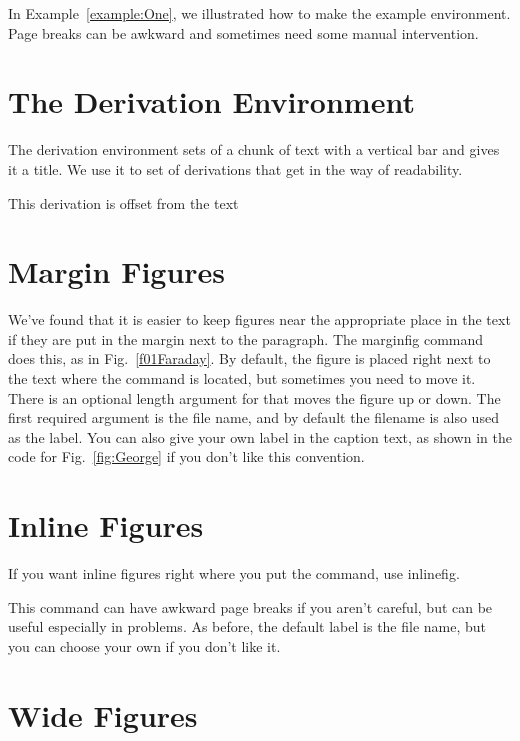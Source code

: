 In Example~\ref{example:One}, we illustrated how to make the
example environment. Page breaks can be awkward and sometimes need
some manual intervention.

\section{The Derivation Environment}

The derivation environment sets of a chunk of text with a vertical
bar and gives it a title.  We use it to set of derivations that get
in the way of readability.
\begin{derivation}{This derivation is offset from the text}
        \lipsum[6-7]
\end{derivation}

\section{Margin Figures}


We've found that it is easier to keep figures near the appropriate
place in the text if they are put in the margin next to the
paragraph.  The marginfig command does this, as in
Fig.~\ref{f01Faraday}.  By default, the figure is placed right next
to the text where the command is located, but sometimes you need to
move it.  There is an optional length argument for that moves the
figure up or down.  The first required argument is the file name,
and by default the filename is also used as the label.  You can
also give your own label in the caption text, as shown in the code
for Fig.~\ref{fig:George} if you don't like this convention.

\section{Inline Figures}
If you want inline figures right where you put the command, use
inlinefig.


This command can have awkward page breaks if you aren't careful,
but can be useful especially in problems.  As before, the default
label is the file name, but you can choose your own if you don't
like it.

\section{Wide Figures}

